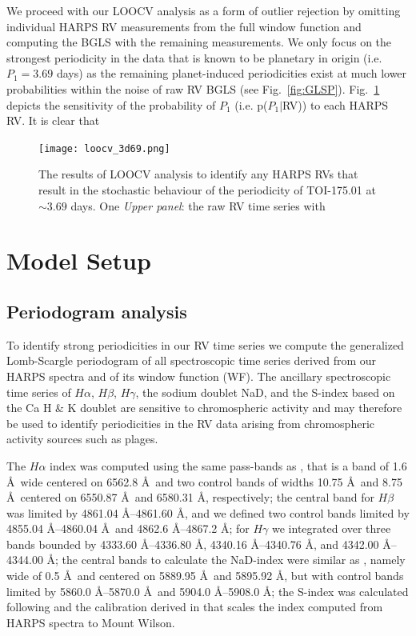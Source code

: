 \documentclass[longauth]{aa}
\begin{document}
We proceed with our LOOCV analysis as a form of outlier rejection by omitting individual HARPS RV measurements from the full window function and computing the BGLS with the remaining measurements. We only focus on the strongest periodicity in the data that is known to be planetary in origin (i.e.$P_1=3.69$ days) as the remaining planet-induced periodicities exist at much lower probabilities within the noise of raw RV BGLS (see Fig.~\ref{fig:GLSP}). Fig.~\ref{fig:loocv} depicts the sensitivity of the probability of $P_1$ (i.e. p($P_1|$RV)) to each HARPS RV. It is clear that  

\begin{figure}
    \centering
    \texttt{[image: loocv\_3d69.png]}
    \caption{The results of LOOCV analysis to identify any HARPS RVs that result in the stochastic behaviour of the periodicity of TOI-175.01 at $\sim 3.69$ days. One  \emph{Upper panel}: the raw RV time series with}
    \label{fig:loocv}
\end{figure}
\fi 



\section{Model Setup}
\label{sec:model}

\subsection{Periodogram analysis}
\label{subsec:kep}
To identify strong periodicities in our RV time series we compute the generalized Lomb-Scargle periodogram \citep[GLSP;][]{zechmeister09} of all spectroscopic time series derived from our HARPS spectra and of its window function (WF). The ancillary spectroscopic time series of $H\alpha$, $H\beta$, $H\gamma$, the sodium doublet NaD, and the S-index based on the Ca H \& K doublet are sensitive to chromospheric activity and may therefore be used to identify periodicities in the RV data arising from chromospheric activity sources such as plages.

The $H\alpha$ index was computed using the same pass-bands as \cite{gomesdasilva12}, that is a band of 1.6 \AA\ wide centered on 6562.8 \AA\ and two control bands of widths 10.75 \AA\ and 8.75 \AA\
centered on 6550.87 \AA\ and 6580.31 \AA, respectively; the central 
band for $H\beta$ was limited by 4861.04 \AA--4861.60 \AA, and we defined two control bands limited by
4855.04 \AA--4860.04 \AA\ and 4862.6 \AA--4867.2 \AA; for $H\gamma$ we integrated over three bands
bounded by 4333.60 \AA--4336.80 \AA, 4340.16 \AA--4340.76 \AA, and 4342.00 \AA--4344.00 \AA; 
the central bands to calculate the NaD-index were similar as 
\citet{gomesdasilva12}, namely wide of 0.5 \AA\ and centered on 5889.95 \AA\ and 5895.92 \AA, 
but with control bands limited by 5860.0 \AA--5870.0 \AA\ and 5904.0 \AA--5908.0 \AA; 
the S-index was calculated following \cite{duncan1991} and the calibration derived in
\citet[][Eq.~3]{astudillodefru17b} that scales the index computed from HARPS spectra to Mount Wilson.
\end{document}
